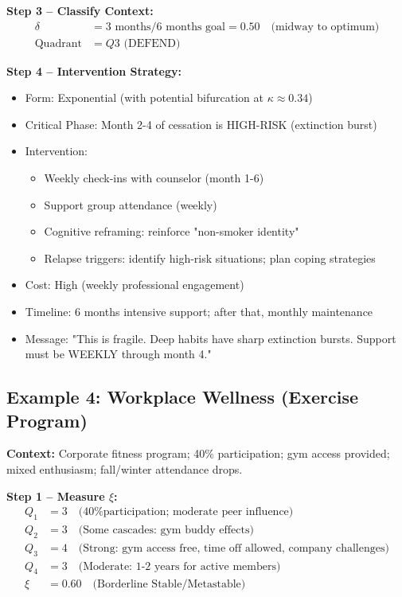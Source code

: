 \documentclass[11pt, a4paper]{article}
\begin{document}
\textbf{Step 3 – Classify Context:}
\begin{align}
\delta &= 3\text{ months} / 6\text{ months goal} = 0.50 \quad \text{(midway to optimum)} \\
\text{Quadrant} &= Q3 \text{ (DEFEND)}
\end{align}

\textbf{Step 4 – Intervention Strategy:}
\begin{itemize}
    \item Form: Exponential (with potential bifurcation at $\kappa \approx 0.34$)
    \item Critical Phase: Month 2-4 of cessation is HIGH-RISK (extinction burst)
    \item Intervention:
    \begin{itemize}
        \item Weekly check-ins with counselor (month 1-6)
        \item Support group attendance (weekly)
        \item Cognitive reframing: reinforce "non-smoker identity"
        \item Relapse triggers: identify high-risk situations; plan coping strategies
    \end{itemize}
    \item Cost: High (weekly professional engagement)
    \item Timeline: 6 months intensive support; after that, monthly maintenance
    \item Message: "This is fragile. Deep habits have sharp extinction bursts. Support must be WEEKLY through month 4."
\end{itemize}

\subsection{Example 4: Workplace Wellness (Exercise Program)}

\textbf{Context:} Corporate fitness program; 40\% participation; gym access provided;
mixed enthusiasm; fall/winter attendance drops.

\textbf{Step 1 – Measure $\xi$:}
\begin{align}
Q_1 &= 3 \quad \text{(40\% participation; moderate peer influence)} \\
Q_2 &= 3 \quad \text{(Some cascades: gym buddy effects)} \\
Q_3 &= 4 \quad \text{(Strong: gym access free, time off allowed, company challenges)} \\
Q_4 &= 3 \quad \text{(Moderate: 1-2 years for active members)} \\
\xi &= 0.60 \quad \text{(Borderline Stable/Metastable)}
\end{align}
\end{document}
